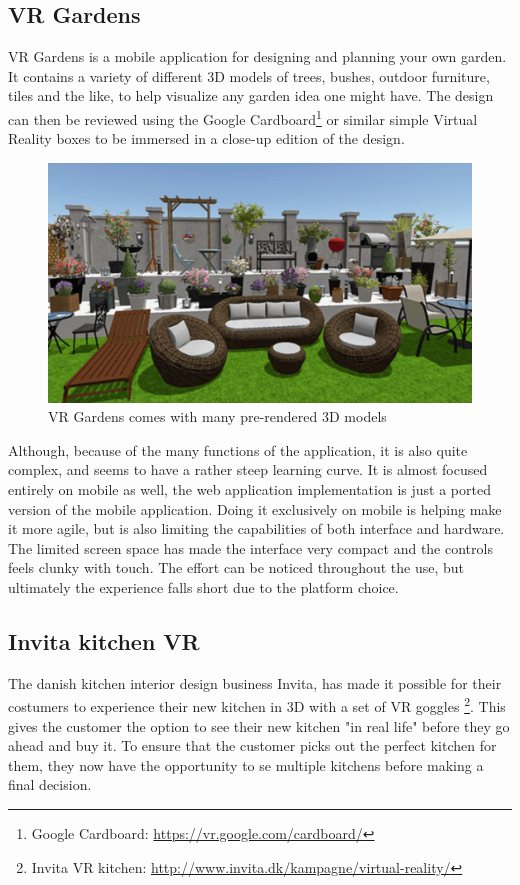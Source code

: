 		\subsection{VR Gardens}
			VR Gardens is a mobile application for designing and planning your own garden. It contains a variety of different 3D models of trees, bushes, outdoor furniture, tiles and the like, to help visualize any garden idea one might have. The design can then be reviewed using the Google Cardboard\footnote{Google Cardboard: \url{https://vr.google.com/cardboard/}} or similar simple Virtual Reality boxes to be immersed in a close-up edition of the design.
			\begin{figure}[H]
				\centering
				\includegraphics[width=0.6\linewidth]{figure/Analysis/vrgardens}
				\caption{VR Gardens comes with many pre-rendered 3D models}
				\label{fig:vrgardens}
			\end{figure}
			Although, because of the many functions of the application, it is also quite complex, and seems to have a rather steep learning curve. It is almost focused entirely on mobile as well, the web application implementation is just a ported version of the mobile application. Doing it exclusively on mobile is helping make it more agile, but is also limiting the capabilities of both interface and hardware. The limited screen space has made the interface very compact and the controls feels clunky with touch. The effort can be noticed throughout the use, but ultimately the experience falls short due to the 	platform choice.
			
		\subsection{Invita kitchen VR}
			The danish kitchen interior design business Invita, has made it possible for their costumers to experience their new kitchen in 3D with a set of VR goggles \footnote{Invita VR kitchen: \url{http://www.invita.dk/kampagne/virtual-reality/}}. This gives the customer the option to see their new kitchen "in real life" before they go ahead and buy it. To ensure that the customer picks out the perfect kitchen for them, they now have the opportunity to se multiple kitchens before making a final decision.\\

